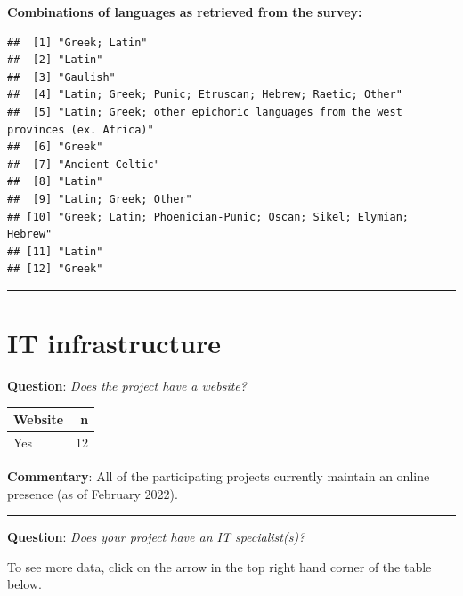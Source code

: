 \documentclass[
  12pt,
]{scrreprt}
\begin{document}
\textbf{Combinations of languages as retrieved from the survey:}

\begin{verbatim}
##  [1] "Greek; Latin"                                                                
##  [2] "Latin"                                                                       
##  [3] "Gaulish"                                                                     
##  [4] "Latin; Greek; Punic; Etruscan; Hebrew; Raetic; Other"                        
##  [5] "Latin; Greek; other epichoric languages from the west provinces (ex. Africa)"
##  [6] "Greek"                                                                       
##  [7] "Ancient Celtic"                                                              
##  [8] "Latin"                                                                       
##  [9] "Latin; Greek; Other"                                                         
## [10] "Greek; Latin; Phoenician-Punic; Oscan; Sikel; Elymian; Hebrew"               
## [11] "Latin"                                                                       
## [12] "Greek"
\end{verbatim}

\begin{center}\rule{0.5\linewidth}{0.5pt}\end{center}

\hypertarget{it-infrastructure}{%
\section{IT infrastructure}\label{it-infrastructure}}

\textbf{Question}: \emph{Does the project have a website?}

\begin{longtable}[]{@{}lr@{}}
\toprule
Website & n \\
\midrule
\endhead
Yes & 12 \\
\bottomrule
\end{longtable}

\textbf{Commentary}: All of the participating projects currently
maintain an online presence (as of February 2022).

\begin{center}\rule{0.5\linewidth}{0.5pt}\end{center}

\textbf{Question}: \emph{Does your project have an IT specialist(s)?}

To see more data, click on the arrow in the top right hand corner of the
table below.
\end{document}
